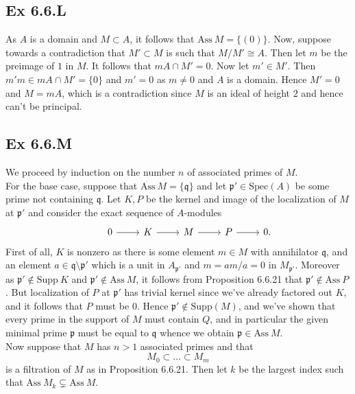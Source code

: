 \documentclass{article}
\theoremstyle{definition}
\newcommand{\Spec}{\text{Spec}}
\newcommand{\Ass}{\text{Ass}}
\newcommand{\Supp}{\text{Supp}}
\begin{document}
\subsection*{Ex 6.6.L}

As $A$ is a domain and $M \subset A$, it follows that $\Ass\ M = \{(0)\}$. Now,
suppose towards a contradiction that $M' \subset M$ is such that $M/M' \cong
	A$. Then let $m$ be the preimage of $1$ in $M$. It follows that $mA \cap M' =
	0$. Now let $m' \in M'$. Then $m'm \in mA \cap M' = \{0\}$ and $m' = 0$ as $m
	\not = 0$ and $A$ is a domain. Hence $M' = 0$ and $M = mA$, which is a
contradiction since $M$ is an ideal of height $2$ and hence can't be principal.

\subsection*{Ex 6.6.M}

We proceed by induction on the number $n$ of associated primes of $M$. \\

For the base case, suppose that $\Ass\ M = \{\mathfrak{q}\}$ and let
$\mathfrak{p}' \in \Spec(A)$ be some prime not containing $\mathfrak{q}$. Let
$K, P$ be the kernel and image of the localization of $M$ at $\mathfrak{p}'$
and consider the exact sequence of $A$-modules
\[
	\begin{tikzcd}
		& 0
		\ar[r]
		& K
		\ar[r]
		& M
		\ar[r]
		& P
		\ar[r]
		& 0.
	\end{tikzcd}
\]
First of all, $K$ is nonzero as there is some element $m \in M$ with
annihilator $\mathfrak{q}$, and an element $a \in \mathfrak{q} \setminus
	\mathfrak{p}'$ which is a unit in $A_{\mathfrak{p}'}$ and $m = am/a = 0$ in
$M_{\mathfrak{p}'}$. Moreover as $\mathfrak{p}' \not \in \Supp\ K$ and
$\mathfrak{p}' \not \in \Ass\ M$, it follows from Proposition 6.6.21 that
$\mathfrak{p}' \not \in \Ass\ P$. But localization of $P$ at $\mathfrak{p}'$
has trivial kernel since we've already factored out $K$, and it follows that
$P$ must be $0$. Hence $\mathfrak{p}' \not \in \Supp(M)$, and we've shown that
every prime in the support of $M$ must contain $Q$, and in particular the given
minimal prime $\mathfrak{p}$ must be equal to $\mathfrak{q}$ whence we obtain
$\mathfrak{p} \in \Ass\ M$. \\

Now suppose that $M$ has $n > 1$ associated primes and that
\[
	M_{0} \subset \ldots \subset M_m
\]
is a filtration of $M$ as in Proposition 6.6.21. Then let $k$ be the largest
index such that $\Ass\ M_k \subsetneq \Ass\ M$. \\
\end{document}
